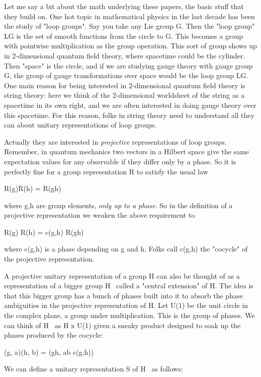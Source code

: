 Let me say a bit about the math underlying these papers, the basic stuff
that they build on.  One hot topic in mathematical physics in the last
decade has been the study of "loop groups".   Say you take any Lie 
group
G.  Then the "loop group" LG is the set of smooth functions from the
circle to G.  This becomes a group with pointwise multiplication as the
group operation.  This sort of group shows up in 2-dimensional quantum
field theory, where spacetime could be the cylinder.  Then "space" is
the circle, and if we are studying gauge theory with gauge group G, the
group of gauge transformations over space would be the loop group LG.  
One main reason for being interested in 2-dimensional quantum field
theory is string theory: here we think of the 2-dimensional worldsheet
of the string as a spacetime in its own right, and we are often
interested in doing gauge theory over this spacetime.  For this reason,
folks in string theory need to understand all they can about unitary
representations of loop groups.

Actually they are interested in \emph{projective} representations of loop
groups.  Remember, in quantum mechanics two vectors in a Hilbert space
give the same expectation values for any observable if they differ only
by a phase.  So it is perfectly fine for a group representation R to
satisfy the usual law

R(g)R(h) = R(gh)

where g,h are group elements, \emph{only up to a phase}.  So in the
definition of a projective representation we weaken the above
requirement to 

R(g) R(h) = c(g,h) R(gh)

where c(g,h) is a phase depending on g and h.  Folks call c(g,h) the
"cocycle" of the projective representation.

A projective unitary representation of a group H can also be thought of
as a representation of a bigger group H~ called a "central extension" of
H.  The idea is that this bigger group has a bunch of phases built into
it to absorb the phase ambiguities in the projective representation
of H.   Let U(1) be the unit circle in the complex plane, a group under
multiplication.  This is the group of phases.  We can think of H~ as 
H x U(1) given a sneaky product designed to soak up the phases produced
by the cocycle:

(g, a)(h, b) = (gh, ab c(g,h))
 
We can define a unitary representation S of H~ as follows:

